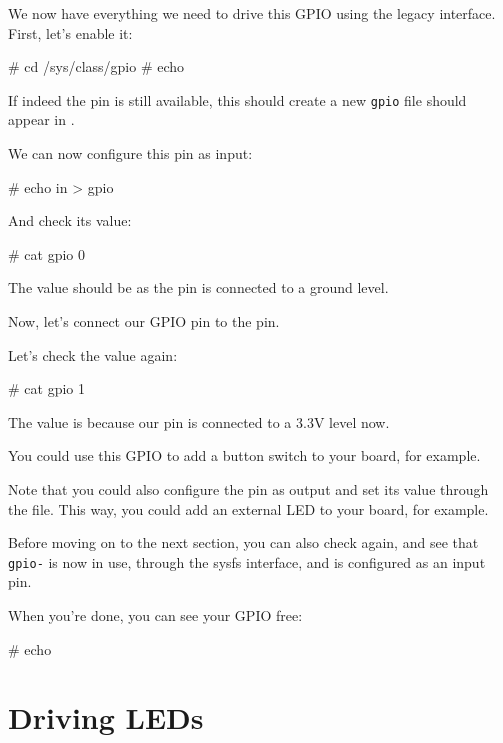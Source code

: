 We now have everything we need to drive this GPIO using the legacy
interface. First, let's enable it:

\begin{bashinput}
# cd /sys/class/gpio
# echo %
\end{bashinput}

If indeed the pin is still available, this should create a new
{\tt gpio\gpionum} file should appear in .

We can now configure this pin as input:

\begin{bashinput}
# echo in > gpio%
\end{bashinput}

And check its value:

\begin{bashinput}
# cat gpio%
0
\end{bashinput}

The value should be  as the pin is connected to a ground level.

Now, let's connect our GPIO pin to the  pin.

Let's check the value again:

\begin{bashinput}
# cat gpio%
1
\end{bashinput}

The value is  because our pin is connected to a 3.3V level now.

You could use this GPIO to add a button switch to your board, for
example.

Note that you could also configure the pin as output and set its value
through the  file. This way, you could add an external LED
to your board, for example.

Before moving on to the next section, you can also check
 again, and see that {\tt gpio-\gpionum} is now
in use, through the sysfs interface, and is configured as an input pin.

When you're done, you can see your GPIO free:

\begin{bashinput}
# echo %
\end{bashinput}

\section{Driving LEDs}

